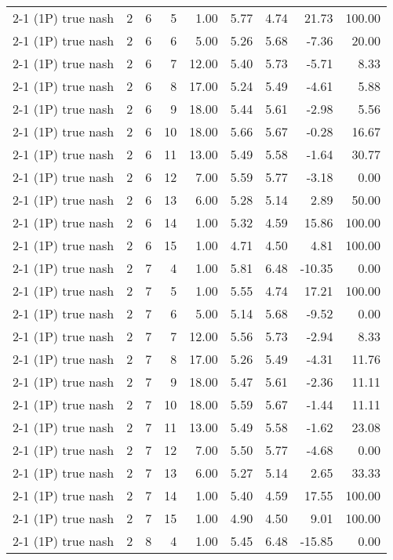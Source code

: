 \begin{tabular}{lrrrrrrrr}
2-1 (1P) true nash & 2 & 6 & 5 & 1.00 & 5.77 & 4.74 & 21.73 & 100.00 \\
2-1 (1P) true nash & 2 & 6 & 6 & 5.00 & 5.26 & 5.68 & -7.36 & 20.00 \\
2-1 (1P) true nash & 2 & 6 & 7 & 12.00 & 5.40 & 5.73 & -5.71 & 8.33 \\
2-1 (1P) true nash & 2 & 6 & 8 & 17.00 & 5.24 & 5.49 & -4.61 & 5.88 \\
2-1 (1P) true nash & 2 & 6 & 9 & 18.00 & 5.44 & 5.61 & -2.98 & 5.56 \\
2-1 (1P) true nash & 2 & 6 & 10 & 18.00 & 5.66 & 5.67 & -0.28 & 16.67 \\
2-1 (1P) true nash & 2 & 6 & 11 & 13.00 & 5.49 & 5.58 & -1.64 & 30.77 \\
2-1 (1P) true nash & 2 & 6 & 12 & 7.00 & 5.59 & 5.77 & -3.18 & 0.00 \\
2-1 (1P) true nash & 2 & 6 & 13 & 6.00 & 5.28 & 5.14 & 2.89 & 50.00 \\
2-1 (1P) true nash & 2 & 6 & 14 & 1.00 & 5.32 & 4.59 & 15.86 & 100.00 \\
2-1 (1P) true nash & 2 & 6 & 15 & 1.00 & 4.71 & 4.50 & 4.81 & 100.00 \\
2-1 (1P) true nash & 2 & 7 & 4 & 1.00 & 5.81 & 6.48 & -10.35 & 0.00 \\
2-1 (1P) true nash & 2 & 7 & 5 & 1.00 & 5.55 & 4.74 & 17.21 & 100.00 \\
2-1 (1P) true nash & 2 & 7 & 6 & 5.00 & 5.14 & 5.68 & -9.52 & 0.00 \\
2-1 (1P) true nash & 2 & 7 & 7 & 12.00 & 5.56 & 5.73 & -2.94 & 8.33 \\
2-1 (1P) true nash & 2 & 7 & 8 & 17.00 & 5.26 & 5.49 & -4.31 & 11.76 \\
2-1 (1P) true nash & 2 & 7 & 9 & 18.00 & 5.47 & 5.61 & -2.36 & 11.11 \\
2-1 (1P) true nash & 2 & 7 & 10 & 18.00 & 5.59 & 5.67 & -1.44 & 11.11 \\
2-1 (1P) true nash & 2 & 7 & 11 & 13.00 & 5.49 & 5.58 & -1.62 & 23.08 \\
2-1 (1P) true nash & 2 & 7 & 12 & 7.00 & 5.50 & 5.77 & -4.68 & 0.00 \\
2-1 (1P) true nash & 2 & 7 & 13 & 6.00 & 5.27 & 5.14 & 2.65 & 33.33 \\
2-1 (1P) true nash & 2 & 7 & 14 & 1.00 & 5.40 & 4.59 & 17.55 & 100.00 \\
2-1 (1P) true nash & 2 & 7 & 15 & 1.00 & 4.90 & 4.50 & 9.01 & 100.00 \\
2-1 (1P) true nash & 2 & 8 & 4 & 1.00 & 5.45 & 6.48 & -15.85 & 0.00 \\

\end{tabular}

